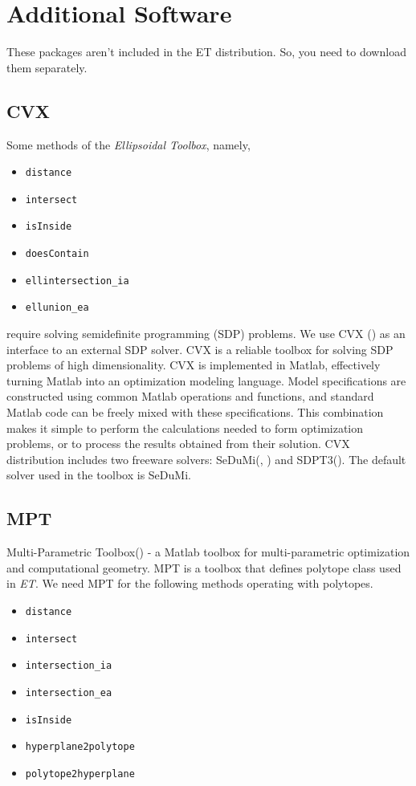 \section{Additional Software}
These packages aren't included in the ET distribution.
So, you need to download them separately.
\subsection{CVX}
Some methods of the {\it Ellipsoidal Toolbox}, namely,
\begin{itemize}
\item {\tt distance}
\item {\tt intersect}
\item {\tt isInside}
\item {\tt doesContain}
\item {\tt ellintersection\_ia}
\item {\tt ellunion\_ea}
\end{itemize}
require solving semidefinite programming (SDP) problems.
We use CVX (\cite{CVX_HOMEPAGE}) as an
interface to an external SDP solver. CVX is a reliable toolbox
for solving SDP problems of high dimensionality.
CVX is implemented in Matlab, effectively turning Matlab into an
optimization modeling language. Model specifications are constructed
using common Matlab operations and functions, and standard
Matlab code can be freely mixed with these specifications.
This combination makes it simple to perform the calculations needed
to form optimization problems, or to process the results
obtained from their solution. CVX distribution includes two freeware
solvers: SeDuMi(\cite{STURM_USING_SEDUMI}, \cite{SEDUMI_HOMEPAGE})
and SDPT3(\cite{SDPT3_HOMEPAGE}). The default solver used in the toolbox is SeDuMi.

\subsection{MPT}
Multi-Parametric Toolbox(\cite{MULTI_PARAMETRIC_TOOLBOX_HOMEPAGE}) - a Matlab toolbox for multi-parametric
optimization and computational geometry. MPT is a toolbox
that defines polytope class
used in {\it ET}.
We need MPT for the following methods operating with polytopes.
\begin{itemize}
\item {\tt distance}
\item {\tt intersect}
\item {\tt intersection\_ia}
\item {\tt intersection\_ea}
\item {\tt isInside}
\item {\tt hyperplane2polytope}
\item {\tt polytope2hyperplane}
\end{itemize}


